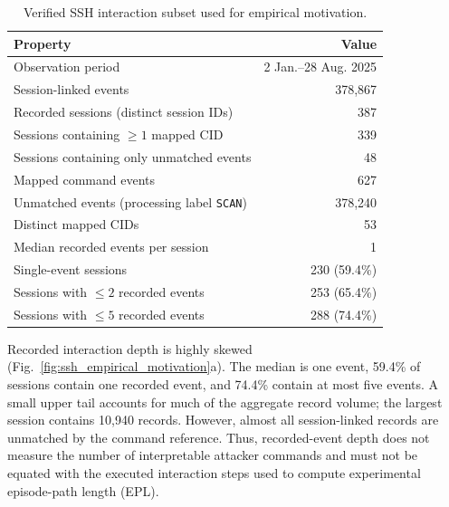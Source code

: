 \begin{table}[!htbp]
\centering
\scriptsize
\caption{Verified SSH interaction subset used for empirical motivation.}
\label{tab:ssh_summary}
\begin{tabular}{lr}
\toprule
\textbf{Property} & \textbf{Value} \\
\midrule
Observation period & 2 Jan.--28 Aug. 2025 \\
Session-linked events & 378,867 \\
Recorded sessions (distinct session IDs) & 387 \\
Sessions containing $\geq 1$ mapped CID & 339 \\
Sessions containing only unmatched events & 48 \\
Mapped command events & 627 \\
Unmatched events (processing label \texttt{SCAN}) & 378,240 \\
Distinct mapped CIDs & 53 \\
Median recorded events per session & 1 \\
Single-event sessions & 230 (59.4\%) \\
Sessions with $\leq 2$ recorded events & 253 (65.4\%) \\
Sessions with $\leq 5$ recorded events & 288 (74.4\%) \\
\bottomrule
\end{tabular}
\end{table}

Recorded interaction depth is highly skewed
(Fig.~\ref{fig:ssh_empirical_motivation}a). The median is one event,
59.4\% of sessions contain one recorded event, and 74.4\% contain at most
five events. A small upper tail accounts for much of the aggregate record
volume; the largest session contains 10,940 records. However, almost all
session-linked records are unmatched by the command reference. Thus,
recorded-event depth does not measure the number of interpretable attacker
commands and must not be equated with the executed interaction steps used
to compute experimental episode-path length (EPL).

